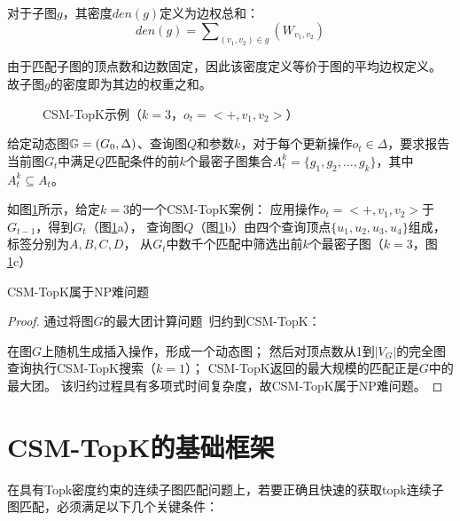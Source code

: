     \begin{definition}[子图密度]\label{def:subgraph-density}

    对于子图$g$，其密度$den(g)$定义为边权总和：
    \[
        den(g) = \sum\nolimits_{(v_1,v_2)\in g}\left(W_{v_1,v_2}\right)
    \]
    
    由于匹配子图的顶点数和边数固定，因此该密度定义等价于图的平均边权定义。
    故子图$g$的密度即为其边的权重之和。
    \end{definition}
    
    \begin{figure}[h!]
        \centering
        \caption{CSM-TopK示例（$k=3$，$o_t=<+,v_{1},v_{2}>$）}
        \label{fig:csm-topk}
    \end{figure}
    
    \begin{definition}\label{def:problem-definition}
    给定动态图$\mathbb{G}=(G_0, \Delta)$、查询图$Q$和参数$k$，对于每个更新操作$o_t\in \Delta$，要求报告当前图$G_t$中满足$Q$匹配条件的前$k$个最密子图集合$A_{t}^k= \{g_1, g_2, \ldots, g_k\}$，其中$A_t^k\subseteq A_t$。
    \end{definition}
    
    如图\ref{fig:csm-topk}所示，给定$k=3$的一个CSM-TopK案例：
    应用操作$o_t=<+,v_1, v_2>$于$G_{t-1}$，得到$G_t$（图\ref{fig:csm-topk}a），
    查询图$Q$（图\ref{fig:csm-topk}b）由四个查询顶点$\{u_1, u_2, u_3, u_4\}$组成，标签分别为$A,B,C,D$，
    从$G_t$中数千个匹配中筛选出前$k$个最密子图（$k=3$，图\ref{fig:csm-topk}c）
    
    \begin{theorem} \label{theorem:np-hard}
    CSM-TopK属于NP难问题
    \end{theorem}
    \begin{proof}
    通过将图$G$的最大团计算问题~\cite{clique-DBLP:journals/eor/WuH15}归约到CSM-TopK：
   
    在图$G$上随机生成插入操作，形成一个动态图；
    然后对顶点数从1到$|V_G|$的完全图查询执行CSM-TopK搜索（$k=1$）；
    CSM-TopK返回的最大规模的匹配正是$G$中的最大团。
    该归约过程具有多项式时间复杂度，故CSM-TopK属于NP难问题。
    \end{proof}
\section{CSM-TopK的基础框架}
\label{ch3:base-framework}
在具有Topk密度约束的连续子图匹配问题上，若要正确且快速的获取topk连续子图匹配，必须满足以下几个关键条件：

